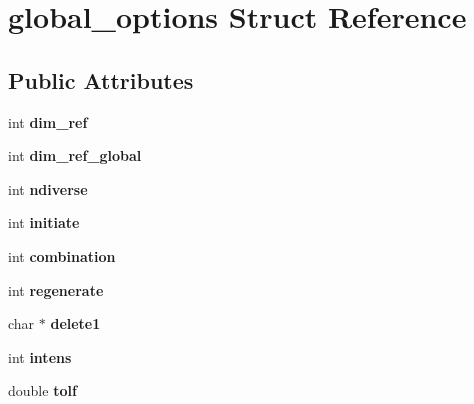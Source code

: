 \hypertarget{structglobal__options}{\section{global\-\_\-options Struct Reference}
\label{structglobal__options}
}
\subsection*{Public Attributes}
\begin{DoxyCompactItemize}
\item 
\hypertarget{structglobal__options_a9fcccd0971ff47c833d11876080af36e}{int {\bfseries dim\-\_\-ref}}\label{structglobal__options_a9fcccd0971ff47c833d11876080af36e}

\item 
\hypertarget{structglobal__options_a870be8f15f968cd045f1927e4caf550b}{int {\bfseries dim\-\_\-ref\-\_\-global}}\label{structglobal__options_a870be8f15f968cd045f1927e4caf550b}

\item 
\hypertarget{structglobal__options_abef7101993a8bcabd0b12911ac8b5f2d}{int {\bfseries ndiverse}}\label{structglobal__options_abef7101993a8bcabd0b12911ac8b5f2d}

\item 
\hypertarget{structglobal__options_a228d973dcab3e27dec688cdabced1433}{int {\bfseries initiate}}\label{structglobal__options_a228d973dcab3e27dec688cdabced1433}

\item 
\hypertarget{structglobal__options_a4e9e9e7e797cca20dcc263f17918bf35}{int {\bfseries combination}}\label{structglobal__options_a4e9e9e7e797cca20dcc263f17918bf35}

\item 
\hypertarget{structglobal__options_ac2d392ffb24ae3e4fb93677ec96be1c1}{int {\bfseries regenerate}}\label{structglobal__options_ac2d392ffb24ae3e4fb93677ec96be1c1}

\item 
\hypertarget{structglobal__options_af482f6107d169b2ff219b0929c26e5c7}{char $\ast$ {\bfseries delete1}}\label{structglobal__options_af482f6107d169b2ff219b0929c26e5c7}

\item 
\hypertarget{structglobal__options_a20a592fe2fe64cdd2827dcb33b0fb8a4}{int {\bfseries intens}}\label{structglobal__options_a20a592fe2fe64cdd2827dcb33b0fb8a4}

\item 
\hypertarget{structglobal__options_aceb1b966f184d3039c69e4a0e2b08c06}{double {\bfseries tolf}}\label{structglobal__options_aceb1b966f184d3039c69e4a0e2b08c06}


\end{DoxyCompactItemize}
